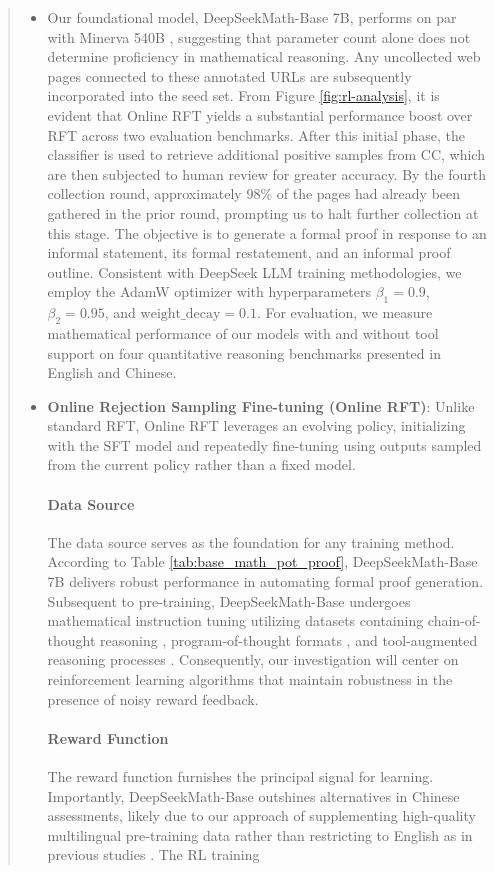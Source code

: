 \begin{abstract}
\begin{itemize}[topsep=0pt]
\citep{gae}, which relies on future rewards $\{r_{\ge t}\}$ and a learned value function $V_{\psi}$. Specifically, during preliminary testing, the model failed on questions involving geometric figures such as triangles and ellipses, potentially pointing to limitations or imbalances in the pretraining and fine-tuning dataset selection. \item Our foundational model, DeepSeekMath-Base 7B, performs on par with Minerva 540B \citep{minerva}, suggesting that parameter count alone does not determine proficiency in mathematical reasoning. Any uncollected web pages connected to these annotated URLs are subsequently incorporated into the seed set. From Figure \ref{fig:rl-analysis}, it is evident that Online RFT yields a substantial performance boost over RFT across two evaluation benchmarks. After this initial phase, the classifier is used to retrieve additional positive samples from CC, which are then subjected to human review for greater accuracy. By the fourth collection round, approximately 98\% of the pages had already been gathered in the prior round, prompting us to halt further collection at this stage. The objective is to generate a formal proof in response to an informal statement, its formal restatement, and an informal proof outline.  Consistent with DeepSeek LLM training methodologies, we employ the AdamW optimizer \citep{adamW} with hyperparameters $\beta_1=0.9$, $\beta_2=0.95$, and $\mathrm{weight\_decay}=0.1$. For evaluation, we measure mathematical performance of our models with and without tool support on four quantitative reasoning benchmarks presented in English and Chinese. \item \textbf{Online Rejection Sampling Fine-tuning (Online RFT)}: Unlike standard RFT, Online RFT leverages an evolving policy, initializing with the SFT model and repeatedly fine-tuning using outputs sampled from the current policy rather than a fixed model. \paragraph{Data Source} The data source serves as the foundation for any training method. According to Table \ref{tab:base_math_pot_proof}, DeepSeekMath-Base 7B delivers robust performance in automating formal proof generation. Subsequent to pre-training, DeepSeekMath-Base undergoes mathematical instruction tuning utilizing datasets containing chain-of-thought reasoning \citep{cot}, program-of-thought formats \citep{pot,pal}, and tool-augmented reasoning processes \citep{tora}. Consequently, our investigation will center on reinforcement learning algorithms that maintain robustness in the presence of noisy reward feedback. \paragraph{Reward Function} The reward function furnishes the principal signal for learning. Importantly, DeepSeekMath-Base outshines alternatives in Chinese assessments, likely due to our approach of supplementing high-quality multilingual pre-training data rather than restricting to English as in previous studies \citep{minerva,llemma}. The RL training 
\end{itemize}
\end{abstract}
